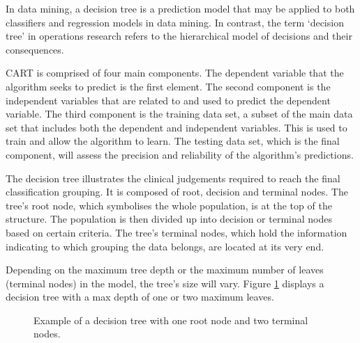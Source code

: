 \documentclass[../thesis.tex]{subfiles}
\begin{document}
In data mining, a decision tree is a prediction model that may be applied to both classifiers and regression models in data mining. In contrast, the term `decision tree' in operations research refers to the hierarchical model of decisions and their consequences.

CART is comprised of four main components. The dependent variable that the algorithm seeks to predict is the first element. The second component is the independent variables that are related to and used to predict the dependent variable. The third component is the training data set, a subset of the main data set that includes both the dependent and independent variables. This is used to train and allow the algorithm to learn. The testing data set, which is the final component, will assess the precision and reliability of the algorithm's predictions.

The decision tree illustrates the clinical judgements required to reach the final classification grouping. It is composed of root, decision and terminal nodes. The tree's root node, which symbolises the whole population, is at the top of the structure. The population is then divided up into decision or terminal nodes based on certain criteria. The tree's terminal nodes, which hold the information indicating to which grouping the data belongs, are located at its very end.

Depending on the maximum tree depth or the maximum number of leaves (terminal nodes) in the model, the tree's size will vary. Figure \ref{Fig:ExampleDT1} displays a decision tree with a max depth of one or two maximum leaves.

\begin{figure}[h!]
\centering
{}
    \caption{Example of a decision tree with one root node and two terminal nodes.}
    \label{Fig:ExampleDT1}
\end{figure}
\end{document}
